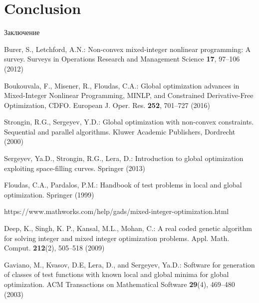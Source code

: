 \documentclass{llncs}
\begin{document}

\section{Conclusion}

Заключение 


\begin{thebibliography}{10}

Burer, S., Letchford, A.N.: Non-convex mixed-integer nonlinear programming: A survey. Surveys in Operations Research and Management Science \textbf{17}, 97--106 (2012) 

Boukouvala, F., Misener, R., Floudas, C.A.: Global optimization advances in Mixed-Integer Nonlinear Programming, MINLP, and Constrained Derivative-Free Optimization, CDFO. European J. Oper. Res. \textbf{252}, 701--727 (2016) 

Strongin, R.G., Sergeyev, Y.D.: Global optimization with non-convex constraints. Sequential and parallel algorithms. Kluwer Academic Publishers, Dordrecht (2000) %

Sergeyev, Ya.D., Strongin, R.G., Lera, D.: Introduction to global optimization exploiting space-filling curves. Springer (2013) %

Floudas, C.A., Pardalos, P.M.:  Handbook of test problems in local and global optimization. Springer (1999)  %

https://www.mathworks.com/help/gads/mixed-integer-optimization.html

Deep, K., Singh, K. P., Kansal, M.L., Mohan, C.: A real coded genetic algorithm for solving integer and mixed integer optimization problems. Appl. Math. Comput. \textbf{212}(2), 505--518 (2009)

 Gaviano, M., Kvasov, D.E, Lera, D., and Sergeyev, Ya.D.: Software for generation of classes of test functions with known local and global minima for global optimization. ACM Transactions on Mathematical Software \textbf{29}(4), 469--480 (2003)


\end{thebibliography}
\end{document}
